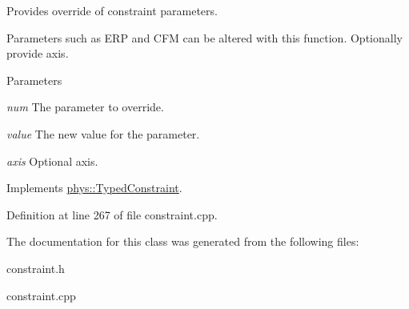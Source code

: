 Provides override of constraint parameters. 

Parameters such as ERP and CFM can be altered with this function. Optionally provide axis. 
\begin{DoxyParams}{Parameters}
\item[{\em num}]The parameter to override. \item[{\em value}]The new value for the parameter. \item[{\em axis}]Optional axis. \end{DoxyParams}


Implements \hyperlink{classphys_1_1TypedConstraint_a31a20a74094f0cb8e4f82d1f99725415}{phys::TypedConstraint}.



Definition at line 267 of file constraint.cpp.



The documentation for this class was generated from the following files:\begin{DoxyCompactItemize}
\item 
constraint.h\item 
constraint.cpp\end{DoxyCompactItemize}
